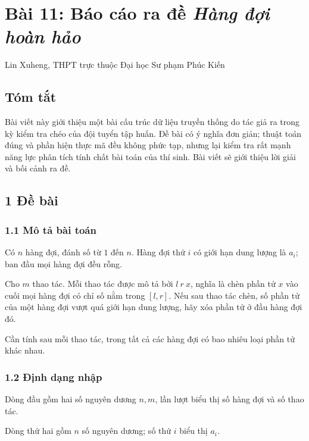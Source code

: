 \documentclass[11pt]{article}
\begin{document}
\section{Bài 11: Báo cáo ra đề \emph{Hàng đợi hoàn hảo}}

\begin{center}
Lin Xuheng, THPT trực thuộc Đại học Sư phạm Phúc Kiến
\end{center}

\subsection*{Tóm tắt}

Bài viết này giới thiệu một bài cấu trúc dữ liệu truyền thống do tác giả ra
trong kỳ kiểm tra chéo của đội tuyển tập huấn. Đề bài có ý nghĩa đơn giản; thuật
toán đúng và phần hiện thực mã đều không phức tạp, nhưng lại kiểm tra rất mạnh
năng lực phân tích tính chất bài toán của thí sinh. Bài viết sẽ giới thiệu lời
giải và bối cảnh ra đề.

\subsection*{1 Đề bài}

\subsubsection*{1.1 Mô tả bài toán}

Có \(n\) hàng đợi, đánh số từ \(1\) đến \(n\). Hàng đợi thứ \(i\) có giới hạn
dung lượng là \(a_i\); ban đầu mọi hàng đợi đều rỗng.

Cho \(m\) thao tác. Mỗi thao tác được mô tả bởi \(l\ r\ x\), nghĩa là chèn phần
tử \(x\) vào cuối mọi hàng đợi có chỉ số nằm trong \([l,r]\). Nếu sau thao tác
chèn, số phần tử của một hàng đợi vượt quá giới hạn dung lượng, hãy xóa phần tử
ở đầu hàng đợi đó.

Cần tính sau mỗi thao tác, trong tất cả các hàng đợi có bao nhiêu loại phần tử
khác nhau.

\subsubsection*{1.2 Định dạng nhập}

Dòng đầu gồm hai số nguyên dương \(n,m\), lần lượt biểu thị số hàng đợi và số
thao tác.

Dòng thứ hai gồm \(n\) số nguyên dương; số thứ \(i\) biểu thị \(a_i\).
\end{document}
